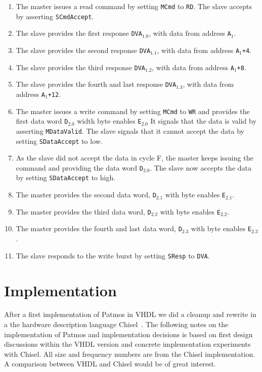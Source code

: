 \documentclass[a4paper,fontsize=10pt,twoside,DIV15,BCOR12mm,headinclude=true,footinclude=false,pagesize,bibtotoc]{scrbook}
\newcommand{\code}[1]{{\texttt{#1}}}
\newcommand{\comment}[3]{

\textsf{\textbf{#1}} {\color{#3}#2}}
\newcommand{\martin}[1]{\comment{Martin}{#1}{Blue}}
\renewcommand{\martin}[1]{}
\begin{document}
\begin{enumerate}[A:]
\item The master issues a read command by setting \code{MCmd} to
  \code{RD}. The slave accepts by asserting \code{SCmdAccept}.
\item The slave provides the first response \code{DVA$_{1.0}$}, with
  data from address \code{A$_1$}.
\item The slave provides the second response \code{DVA$_{1.1}$}, with
  data from address \code{A$_1$+4}.
\item The slave provides the third response \code{DVA$_{1.2}$}, with
  data from address \code{A$_1$+8}.
\item The slave provides the fourth and last response
  \code{DVA$_{1.3}$}, with data from address \code{A$_1$+12}.
\item The master issues a write command by setting \code{MCmd} to
  \code{WR} and provides the first data word \code{D$_{2.0}$} width
  byte enables \code{E$_{2.0}$} It signals that the data is valid by
  asserting \code{MDataValid}. The slave signals that it cannot accept
  the data by setting \code{SDataAccept} to low.
\item As the slave did not accept the data in cycle F, the master
  keeps issuing the command and providing the data word
  \code{D$_{2.0}$}. The slave now accepts the data by setting
  \code{SDataAccept} to high.
\item The master provides the second data word, \code{D$_{2.1}$} with
  byte enables \code{E$_{2.1}$}.
\item The master provides the third data word, \code{D$_{2.2}$} with
  byte enables \code{E$_{2.2}$}.
\item The master provides the fourth and last data word,
  \code{D$_{2.3}$} with byte enables \code{E$_{2.3}$}.
\item The slave responds to the write burst by setting \code{SResp} to
  \code{DVA}.
\end{enumerate}

\chapter{Implementation}

\martin{This sections shall describe implementation details,
decisions, and options.}

After a first implementation of Patmos in VHDL we did a cleanup and
rewrite in a the hardware description language Chisel~\cite{chisel:dac2012}.
The following notes on the implementation of Patmos and implementation
decisions is based on first design discussions within the VHDL version
and concrete implementation experiments with Chisel. All size and frequency
numbers are from the Chisel implementation. A comparison between VHDL
and Chisel would be of great interest.
\end{document}
